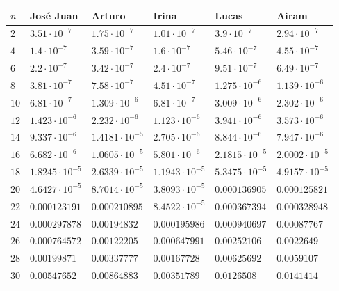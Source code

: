 \documentclass[12pt]{article}
\begin{document}
    \begin{table}
        \centering
        \begin{tabular}{|l|l|l|l|l|l|}
            \hline
            $n$ & José Juan & Arturo & Irina & Lucas & Airam \\
            \hline
            $2$ & $3.51\cdot 10^{-7}$ & $1.75\cdot 10^{-7}$ & $1.01\cdot 10^{-7}$ & $3.9\cdot 10^{-7}$ & $2.94\cdot 10^{-7}$ \\
            $4$ & $1.4\cdot 10^{-7}$ & $3.59\cdot 10^{-7}$ & $1.6\cdot 10^{-7}$ & $5.46\cdot 10^{-7}$ & $4.55\cdot 10^{-7}$ \\
            $6$ & $2.2\cdot 10^{-7}$ & $3.42\cdot 10^{-7}$ & $2.4\cdot 10^{-7}$ & $9.51\cdot 10^{-7}$ & $6.49\cdot 10^{-7}$ \\
            $8$ & $3.81\cdot 10^{-7}$ & $7.58\cdot 10^{-7}$ & $4.51\cdot 10^{-7}$ & $1.275\cdot 10^{-6}$ & $1.139\cdot 10^{-6}$ \\
            $10$ & $6.81\cdot 10^{-7}$ & $1.309\cdot 10^{-6}$ & $6.81\cdot 10^{-7}$ & $3.009\cdot 10^{-6}$ & $2.302\cdot 10^{-6}$ \\
            $12$ & $1.423\cdot 10^{-6}$ & $2.232\cdot 10^{-6}$ & $1.123\cdot 10^{-6}$ & $3.941\cdot 10^{-6}$ & $3.573\cdot 10^{-6}$ \\
            $14$ & $9.337\cdot 10^{-6}$ & $1.4181\cdot 10^{-5}$ & $2.705\cdot 10^{-6}$ & $8.844\cdot 10^{-6}$ & $7.947\cdot 10^{-6}$ \\
            $16$ & $6.682\cdot 10^{-6}$ & $1.0605\cdot 10^{-5}$ & $5.801\cdot 10^{-6}$ & $2.1815\cdot 10^{-5}$ & $2.0002\cdot 10^{-5}$ \\
            $18$ & $1.8245\cdot 10^{-5}$ & $2.6339\cdot 10^{-5}$ & $1.1943\cdot 10^{-5}$ & $5.3475\cdot 10^{-5}$ & $4.9157\cdot 10^{-5}$ \\
            $20$ & $4.6427\cdot 10^{-5}$ & $8.7014\cdot 10^{-5}$ & $3.8093\cdot 10^{-5}$ & $0.000136905$ & $0.000125821$ \\
            $22$ & $0.000123191$ & $0.000210895$ & $8.4522\cdot 10^{-5}$ & $0.000367394$ & $0.000328948$ \\
            $24$ & $0.000297878$ & $0.00194832$ & $0.000195986$ & $0.000940697$ & $0.00087767$ \\
            $26$ & $0.000764572$ & $0.00122205$ & $0.000647991$ & $0.00252106$ & $0.0022649$ \\
            $28$ & $0.00199871$ & $0.00337777$ & $0.00167728$ & $0.00625692$ & $0.0059107$ \\
            $30$ & $0.00547652$ & $0.00864883$ & $0.00351789$ & $0.0126508$ & $0.0141414$ \\

\end{tabular}
\end{table}
\end{document}
